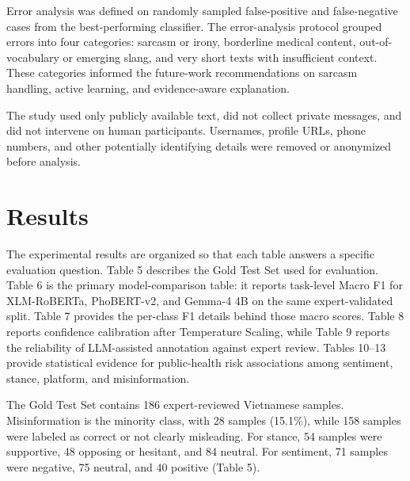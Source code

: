 \documentclass[runningheads]{llncs}
\begin{document}
Error analysis was defined on randomly sampled false-positive and false-negative cases from the best-performing classifier. The error-analysis protocol grouped errors into four categories: sarcasm or irony, borderline medical content, out-of-vocabulary or emerging slang, and very short texts with insufficient context. These categories informed the future-work recommendations on sarcasm handling, active learning, and evidence-aware explanation.

The study used only publicly available text, did not collect private messages, and did not intervene on human participants. Usernames, profile URLs, phone numbers, and other potentially identifying details were removed or anonymized before analysis.

\section{Results}
The experimental results are organized so that each table answers a specific evaluation question. Table 5 describes the Gold Test Set used for evaluation. Table 6 is the primary model-comparison table: it reports task-level Macro F1 for XLM-RoBERTa, PhoBERT-v2, and Gemma-4 4B on the same expert-validated split. Table 7 provides the per-class F1 details behind those macro scores. Table 8 reports confidence calibration after Temperature Scaling, while Table 9 reports the reliability of LLM-assisted annotation against expert review. Tables 10--13 provide statistical evidence for public-health risk associations among sentiment, stance, platform, and misinformation.

The Gold Test Set contains 186 expert-reviewed Vietnamese samples. Misinformation is the minority class, with 28 samples (15.1\%), while 158 samples were labeled as correct or not clearly misleading. For stance, 54 samples were supportive, 48 opposing or hesitant, and 84 neutral. For sentiment, 71 samples were negative, 75 neutral, and 40 positive (Table 5).
\end{document}
